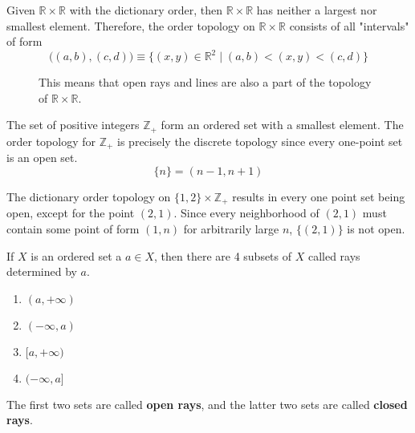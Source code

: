   \begin{example}
    Given $\mathbb{R} \times \mathbb{R}$ with the dictionary order, then $\mathbb{R} \times \mathbb{R}$ has neither a largest nor smallest element. Therefore, the order topology on $\mathbb{R} \times \mathbb{R}$ consists of all "intervals" of form
    \begin{equation}
      \big((a, b), (c, d) \big) \equiv  \{(x, y) \in \mathbb{R}^2 \mid (a, b) < (x, y) < (c, d)\}
    \end{equation}

    \begin{figure}[H]
      \centering 
      \caption{This means that open rays and lines are also a part of the topology of $\mathbb{R} \times \mathbb{R}$. } 
      \label{fig:r2_dict_order}
    \end{figure}
  \end{example}

  \begin{example}
    The set of positive integers $\mathbb{Z}_+$ form an ordered set with a smallest element. The order topology for $\mathbb{Z}_+$ is precisely the discrete topology since every one-point set is an open set. 
    \begin{equation}
      \{n\} = (n-1, n+1)
    \end{equation}
  \end{example}

  \begin{example}
    The dictionary order topology on $\{1, 2\} \times \mathbb{Z}_+$ results in every one point set being open, except for the point $(2, 1)$. Since every neighborhood of $(2,1)$ must contain some point of form $(1, n)$ for arbitrarily large $n$, $\{(2,1)\}$ is not open. 
  \end{example}

  \begin{definition}
    If $X$ is an ordered set a $a \in X$, then there are 4 subsets of $X$ called rays determined by $a$. 
    \begin{enumerate}
      \item $(a, +\infty)$ 
      \item $(-\infty, a)$
      \item $[a, +\infty)$
      \item $(-\infty, a]$
    \end{enumerate}
    The first two sets are called \textbf{open rays}, and the latter two sets are called \textbf{closed rays}. 
  \end{definition}

